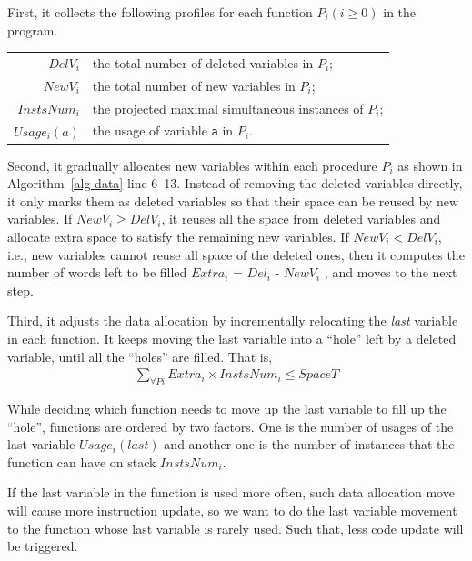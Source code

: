First, it collects the following profiles for each function $P_i(i\geq
0)$ in the program. 
\vspace{+0.1in}
\begin{small}
\begin{center}
\begin{tabular}{r|l}
$DelV_i$ & the total number of deleted variables in $P_i$; \\
$NewV_i$ & the total number of new variables in $P_i$; \\
$InstsNum_i$ & the projected maximal simultaneous instances of $P_i$; \\
$Usage_i(a)$ & the usage of variable {\tt a} in $P_i$. 
\vspace{+0.1in}
\end{tabular}
\end{center}
\end{small}

Second, it gradually allocates new variables within each procedure
$P_i$ as shown in Algorithm~\ref{alg-data} line 6~13. 
Instead of removing the deleted variables directly, it only marks them as deleted variables so that their space can be reused by new variables. If $NewV_i \geq DelV_i$, it reuses all the space from deleted variables and allocate extra space to satisfy
the remaining new variables. If $NewV_i < DelV_i$, i.e., new variables
cannot reuse all space of the deleted ones, then it computes the number of words left to be filled $Extra_i$ = $Del_i$ - $NewV_i$ ,
and moves to the next step.

Third, it adjusts the data allocation by incrementally relocating the
{\em last} variable in each function. It keeps moving the last variable into a
``hole'' left by a deleted variable, until all the ``holes'' are filled.
That is,
\begin{eqnarray}
\sum_{\forall Pi} Extra_i \times InstsNum_i \leq SpaceT
\label{spacet}
\end{eqnarray}

While deciding which function needs to move up the last variable to fill up the ``hole'', 
functions are ordered by two factors.
One is the number of usages of the last variable $Usage_i(last)$ and another one is the number of instances 
that the function can have on stack $InstsNum_i$.

If the last variable in the function is used more often,
such data allocation move will cause more instruction update, so we want
to do the last variable movement to the function whose last variable is
rarely used. Such that, less code update will be triggered.

